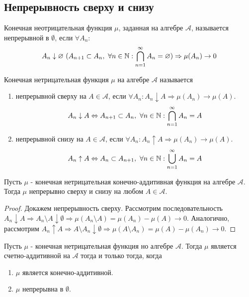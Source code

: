 \documentclass[a4paper, 12pt]{article}
\begin{document}
\subsection{Непрерывность сверху и снизу}
\begin{definition}
    Конечная неотрицательная функция $\mu$, заданная на алгебре $\mathcal{A}$, называется непрерывной в $\emptyset$, если $\forall A_n$:
    \[A_n \downarrow \varnothing\ (A_{n+1}\subset A_n,\ \forall n\in \mathbb{N}: \bigcap\limits_{n=1}^{\infty}A_n=\varnothing) \Rightarrow \mu(A_n)\to 0\]
\end{definition}
\begin{definition}
    Конечная нетрицательная функция $\mu$ на алгебре $\mathcal{A}$ называется 
    \begin{enumerate}
        \item непрерывной сверху на $A \in \mathcal{A}$, если $\forall A_n : A_n\downarrow A \Rightarrow \mu(A_n)\to \mu(A)$.\\
        \[A_n \downarrow A \Leftrightarrow A_{n+1}\subset A_n,\ \forall n\in \mathbb{N}: \bigcap\limits_{n=1}^{\infty}A_n=A\]
        \item непрерывной снизу на $A\in \mathcal{A}$, если $\forall A_n: A_n\uparrow A \Rightarrow \mu(A_n)\to \mu(A)$.
        \[A_n \uparrow A \Leftrightarrow A_{n}\subset A_{n+1},\ \forall n\in \mathbb{N}: \bigcup\limits_{n=1}^{\infty}A_n=A\]
    \end{enumerate}
\end{definition}
\begin{lemma}
    Пусть $\mu$ - конечная нетрицательная конечно-аддитивная функция на алгебре $\mathcal{A}$. Тогда $\mu$ непрерывно сверху и снизу на любом $A\in \mathcal{A}$.
\end{lemma}
\begin{proof}
    Докажем непрерывность сверху. Рассмотрим последовательность $A_n \downarrow A \Rightarrow A_n\setminus A \downarrow \emptyset \Rightarrow \mu(A_n\setminus A)=\mu(A_n)-\mu(A)\to 0$. Аналогично, рассмотрим $A_n\uparrow A \Rightarrow A\setminus A_n \downarrow \emptyset \Rightarrow \mu(A\setminus A_n)=\mu(A)-\mu(A_n)\to 0$.
\end{proof}
\begin{theorem}
    Пусть $\mu$ - конечная нетрицательная функция но алгебре $\mathcal{A}$. Тогда $\mu$ является счетно-аддитивной на $\mathcal{A}$ тогда и только тогда, когда
    \begin{enumerate}
        \item $\mu$ является конечно-аддитивной.
        \item $\mu$ непрерывна в $\emptyset$.
    \end{enumerate}
\end{theorem}
\end{document}
